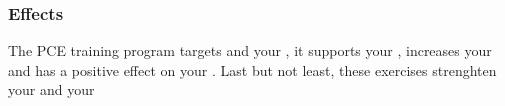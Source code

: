 \begin{frame}
  \frametitle{Effects}

  The PCE training program targets  and your ,
  it supports your ,
  increases your  and has a positive effect on your .
  Last but not least, these exercises strenghten your  and your 
\end{frame}
